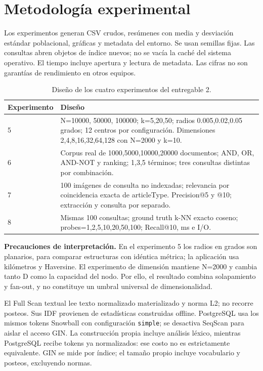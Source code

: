 \documentclass[11pt,a4paper]{article}
\newcommand{\code}[1]{\texttt{#1}}
\begin{document}
\newpage
\section{Metodología experimental}
Los experimentos generan CSV crudos, resúmenes con media y desviación estándar poblacional, gráficas y metadata del entorno. Se usan semillas fijas. Las consultas abren objetos de índice nuevos; no se vacía la caché del sistema operativo. El tiempo incluye apertura y lectura de metadata. Las cifras no son garantías de rendimiento en otros equipos.

\begin{table}[H]\centering\small
\begin{tabular}{@{}lp{10.5cm}@{}}\toprule
Experimento & Diseño\\\midrule
5 & N=10000, 50000, 100000; k=5,20,50; radios 0.005,0.02,0.05 grados; 12 centros por configuración. Dimensiones 2,4,8,16,32,64,128 con N=2000 y k=10.\\
6 & Corpus real de 1000,5000,10000,20000 documentos; AND, OR, AND-NOT y ranking; 1,3,5 términos; tres consultas distintas por combinación.\\
7 & 100 imágenes de consulta no indexadas; relevancia por coincidencia exacta de articleType. Precision@5 y @10; extracción y consulta por separado.\\
8 & Mismas 100 consultas; ground truth k-NN exacto coseno; probes=1,2,5,10,20,50,100; Recall@10, ms e I/O.\\\bottomrule
\end{tabular}\caption{Diseño de los cuatro experimentos del entregable 2.}
\end{table}

\textbf{Precauciones de interpretación.} En el experimento 5 los radios en grados son planarios, para comparar estructuras con idéntica métrica; la aplicación usa kilómetros y Haversine. El experimento de dimensión mantiene N=2000 y cambia tanto D como la capacidad del nodo. Por ello, el resultado combina solapamiento y fan-out, y no constituye un umbral universal de dimensionalidad.

El Full Scan textual lee texto normalizado materializado y norma L2; no recorre posteos. Sus IDF provienen de estadísticas construidas offline. PostgreSQL usa los mismos tokens Snowball con configuración \code{simple}; se desactiva SeqScan para aislar el acceso GIN. La construcción propia incluye análisis léxico, mientras PostgreSQL recibe tokens ya normalizados: ese costo no es estrictamente equivalente. GIN se mide por índice; el tamaño propio incluye vocabulario y posteos, excluyendo normas.
\end{document}
